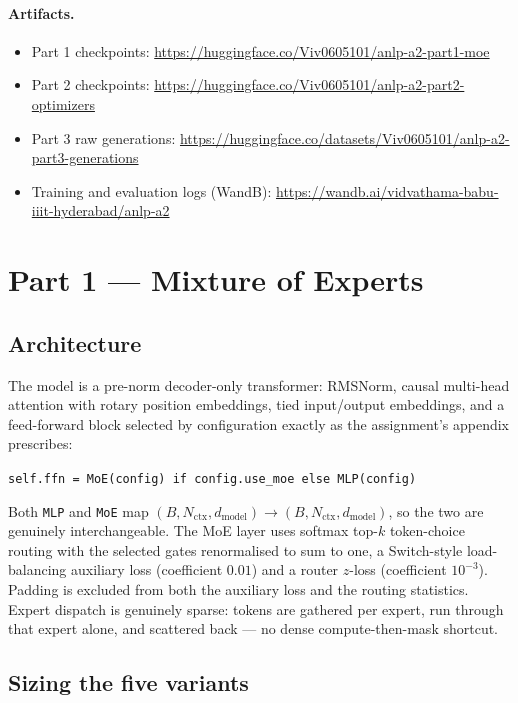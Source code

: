 \documentclass[11pt]{article}
\begin{document}
\paragraph{Artifacts.}
{\footnotesize
\begin{itemize}
  \item Part 1 checkpoints: \url{https://huggingface.co/Viv0605101/anlp-a2-part1-moe}
  \item Part 2 checkpoints: \url{https://huggingface.co/Viv0605101/anlp-a2-part2-optimizers}
  \item Part 3 raw generations: \url{https://huggingface.co/datasets/Viv0605101/anlp-a2-part3-generations}
  \item Training and evaluation logs (WandB): \url{https://wandb.ai/vidvathama-babu-iiit-hyderabad/anlp-a2}
\end{itemize}}

\section{Part 1 --- Mixture of Experts}

\subsection{Architecture}

The model is a pre-norm decoder-only transformer: RMSNorm, causal multi-head
attention with rotary position embeddings, tied input/output embeddings, and a
feed-forward block selected by configuration exactly as the assignment's
appendix prescribes:

\begin{center}
\small\texttt{self.ffn = MoE(config) if config.use\_moe else MLP(config)}
\end{center}

\noindent
Both \texttt{MLP} and \texttt{MoE} map $(B, N_{\text{ctx}}, d_{\text{model}})
\rightarrow (B, N_{\text{ctx}}, d_{\text{model}})$, so the two are genuinely
interchangeable. The MoE layer uses softmax top-$k$ token-choice routing with the
selected gates renormalised to sum to one, a Switch-style load-balancing
auxiliary loss \citep{fedus2022switch} (coefficient $0.01$) and a router
$z$-loss (coefficient $10^{-3}$). Padding is excluded
from both the auxiliary loss and the routing
statistics. Expert dispatch is genuinely sparse: tokens are gathered per expert,
run through that expert alone, and scattered back --- no dense
compute-then-mask shortcut.

\subsection{Sizing the five variants}
\end{document}
